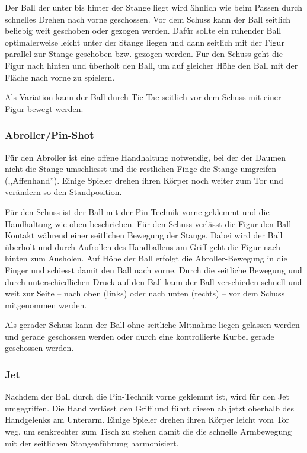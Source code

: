 Der Ball der unter bis hinter der Stange liegt wird ähnlich wie beim Passen durch schnelles Drehen nach vorne geschossen.
Vor dem Schuss kann der Ball seitlich beliebig weit geschoben oder gezogen werden.
Dafür sollte ein ruhender Ball optimalerweise leicht unter der Stange liegen und dann seitlich mit der Figur parallel zur Stange geschoben bzw. gezogen werden.
Für den Schuss geht die Figur nach hinten und überholt den Ball, um auf gleicher Höhe den Ball mit der Fläche nach vorne zu spielern.

Als Variation kann der Ball durch Tic-Tac seitlich vor dem Schuss mit einer Figur bewegt werden.

\subsubsection{Abroller/Pin-Shot}
Für den Abroller ist eine offene Handhaltung notwendig, bei der der Daumen nicht die Stange umschliesst und die restlichen Finge die Stange umgreifen (,,Affenhand'').
Einige Spieler drehen ihren Körper noch weiter zum Tor und verändern so den Standposition.

Für den Schuss ist der Ball mit der Pin-Technik vorne geklemmt und die Handhaltung wie oben beschrieben. 
Für den Schuss verlässt die Figur den Ball Kontakt während einer seitlichen Bewegung der Stange.
Dabei wird der Ball überholt und durch Aufrollen des Handballens am Griff geht die Figur nach hinten zum Ausholen. 
Auf Höhe der Ball erfolgt die Abroller-Bewegung in die Finger und schiesst damit den Ball nach vorne.
Durch die seitliche Bewegung und durch unterschiedlichen Druck auf den Ball kann der Ball verschieden schnell und weit zur Seite -- nach oben (links) oder nach unten (rechts) -- vor dem Schuss mitgenommen werden.

Als gerader Schuss kann der Ball ohne seitliche Mitnahme liegen gelassen werden und gerade geschossen werden oder durch eine kontrollierte Kurbel gerade geschossen werden. 

\subsubsection{Jet}
Nachdem der Ball durch die Pin-Technik vorne geklemmt ist, wird für den Jet umgegriffen.
Die Hand verlässt den Griff und führt diesen ab jetzt oberhalb des Handgelenks am Unterarm.
Einige Spieler drehen ihren Körper leicht vom Tor weg, um senkrechter zum Tisch zu stehen damit die die schnelle Armbewegung mit der seitlichen Stangenführung harmonisiert.

